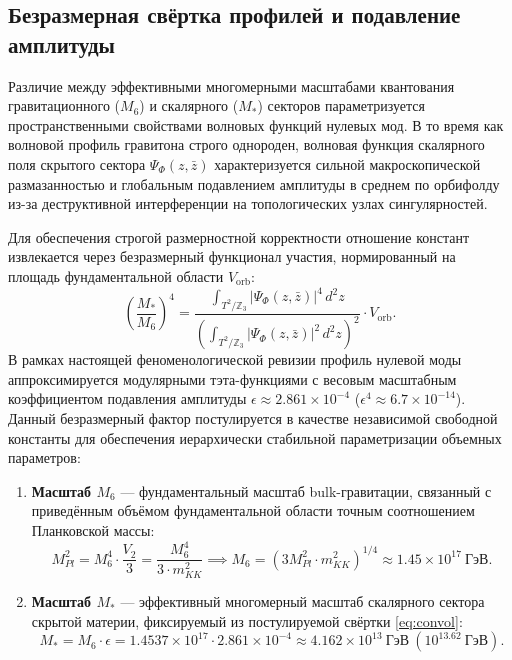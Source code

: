 \documentclass[12pt,a4paper]{article}
\begin{document}
\subsection{Безразмерная свёртка профилей и подавление амплитуды}
Различие между эффективными многомерными масштабами квантования гравитационного ($M_6$) и скалярного ($M_*$) секторов параметризуется пространственными свойствами волновых функций нулевых мод. В то время как волновой профиль гравитона строго однороден, волновая функция скалярного поля скрытого сектора $\Psi_{\Phi}(z,\bar{z})$ характеризуется сильной макроскопической размазанностью и глобальным подавлением амплитуды в среднем по орбифолду из-за деструктивной интерференции на топологических узлах сингулярностей.

Для обеспечения строгой размерностной корректности отношение констант извлекается через безразмерный функционал участия, нормированный на площадь фундаментальной области $V_{\text{orb}}$:
\begin{equation}
\left(\frac{M_*}{M_6}\right)^4 = \frac{\int_{T^2/\mathbb{Z}_3} |\Psi_{\Phi}(z,\bar{z})|^4 \, d^2z}{\left( \int_{T^2/\mathbb{Z}_3} |\Psi_{\Phi}(z,\bar{z})|^2 \, d^2z \right)^2} \cdot V_{\text{orb}}.
\label{eq:convol}
\end{equation}
В рамках настоящей феноменологической ревизии профиль нулевой моды аппроксимируется модулярными тэта-функциями с весовым масштабным коэффициентом подавления амплитуды $\epsilon \approx 2.861 \times 10^{-4}$ ($\epsilon^4 \approx 6.7 \times 10^{-14}$). Данный безразмерный фактор постулируется в качестве независимой свободной константы для обеспечения иерархически стабильной параметризации объемных параметров:
\begin{enumerate}
\item \textbf{Масштаб $M_6$} --- фундаментальный масштаб bulk-гравитации, связанный с приведённым объёмом фундаментальной области точным соотношением Планковской массы:
\begin{equation}
M_{Pl}^2 = M_6^4 \cdot \frac{V_2}{3} = \frac{M_6^4}{3 \cdot m_{KK}^2} \implies M_6 = \left(3 M_{Pl}^2 \cdot m_{KK}^2\right)^{1/4} \approx 1.45 \times 10^{17} \ \text{ГэВ}.
\end{equation}
\item \textbf{Масштаб $M_*$} --- эффективный многомерный масштаб скалярного сектора скрытой материи, фиксируемый из постулируемой свёртки \eqref{eq:convol}:
\begin{equation}
M_* = M_6 \cdot \epsilon = 1.4537 \times 10^{17} \cdot 2.861 \times 10^{-4} \approx 4.162 \times 10^{13} \ \text{ГэВ} \ (10^{13.62} \ \text{ГэВ}).
\end{equation}
\end{enumerate}
\end{document}
